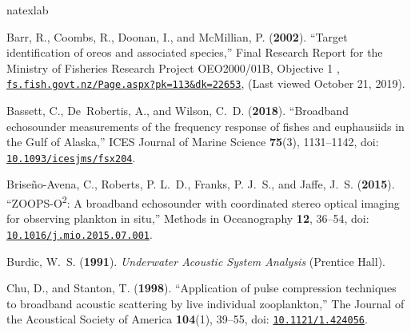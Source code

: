 \documentclass[preprint,12pt,TurnOnLineNumbers]{JASAnew}
\begin{document}
\begin{thebibliography}{39}
\def\enquote#1{``#1,''}
\def\plainquote#1{``#1''}
\expandafter\ifx\csname natexlab\endcsname\relax\def\natexlab#1{#1}\fi
\providecommand{\dourl}[1]{\href{http://#1}{\nolinkurl{#1}}}
\providecommand{\bibinfo}[2]{#2}
\providecommand{\noopsort}[1]{}
\providecommand{\switchargs}[2]{#2#1}
  \def\eatspace #1{#1}
\providecommand{\dodoi}[1]{doi: \href{http://dx.doi.org/#1}{\nolinkurl{#1}}}

\bibinfo{author}{Barr, R.}, \bibinfo{author}{Coombs, R.},
  \bibinfo{author}{Doonan, I.},  and \bibinfo{author}{McMillian, P.}
  (\textbf{\bibinfo{year}{2002}}). \enquote{\bibinfo{title}{Target
  identification of oreos and associated species}} \bibinfo{type}{Final
  {{Research Report}} for the {{Ministry}} of {{Fisheries Research Project
  OEO2000}}/{{01B}}, {{Objective}} 1} ,
  \dourl{fs.fish.govt.nz/Page.aspx?pk=113&dk=22653}, \bibinfo{note}{(Last
  viewed October 21, 2019)}.

\bibinfo{author}{Bassett, C.}, \bibinfo{author}{De~Robertis, A.},  and
  \bibinfo{author}{Wilson, C.~D.} (\textbf{\bibinfo{year}{2018}}).
  \enquote{\bibinfo{title}{Broadband echosounder measurements of the frequency
  response of fishes and euphausiids in the {{Gulf}} of {{Alaska}}}}
  \bibinfo{journal}{ICES Journal of Marine Science} \textbf{75}(3),
  \bibinfo{pages}{1131--1142}, \dodoi{10.1093/icesjms/fsx204}.

\bibinfo{author}{Briseño-Avena, C.}, \bibinfo{author}{Roberts, P. L.~D.},
  \bibinfo{author}{Franks, P. J.~S.},  and \bibinfo{author}{Jaffe, J.~S.}
  (\textbf{\bibinfo{year}{2015}}).
  \enquote{\bibinfo{title}{{ZOOPS-O\textsuperscript{2}: A broadband echosounder
  with coordinated stereo optical imaging for observing plankton in situ}}}
  \bibinfo{journal}{Methods in Oceanography} \textbf{12},
  \bibinfo{pages}{36--54}, \dodoi{10.1016/j.mio.2015.07.001}.

\bibinfo{author}{Burdic, W.~S.} (\textbf{\bibinfo{year}{1991}}).
  \emph{\bibinfo{title}{Underwater Acoustic System Analysis}}
  (\bibinfo{publisher}{{Prentice Hall}}).

\bibinfo{author}{Chu, D.},  and \bibinfo{author}{Stanton, T.}
  (\textbf{\bibinfo{year}{1998}}). \enquote{\bibinfo{title}{{Application of
  pulse compression techniques to broadband acoustic scattering by live
  individual zooplankton}}} \bibinfo{journal}{The Journal of the Acoustical
  Society of America} \textbf{104}(1), \bibinfo{pages}{39–55},
  \dodoi{10.1121/1.424056}.


\end{thebibliography}
\end{document}
